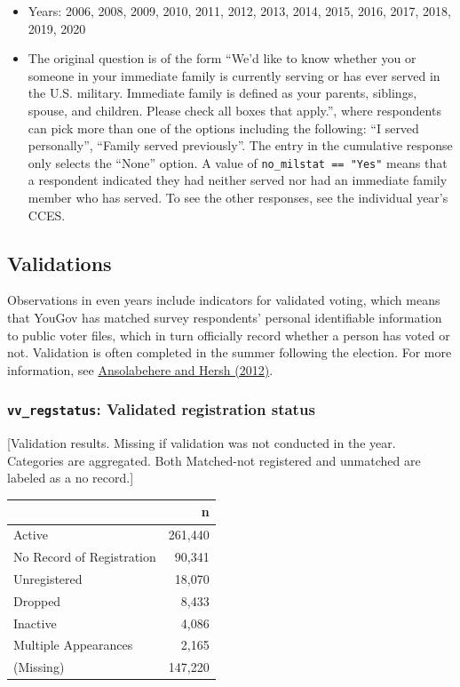 \documentclass[10pt,article,oneside]{memoir}
\theoremstyle{definition}
\begin{document}
\begin{itemize}
\tightlist
\item
  Years: 2006, 2008, 2009, 2010, 2011, 2012, 2013, 2014, 2015, 2016,
  2017, 2018, 2019, 2020
\item
  The original question is of the form ``We'd like to know whether you
  or someone in your immediate family is currently serving or has ever
  served in the U.S. military. Immediate family is defined as your
  parents, siblings, spouse, and children. Please check all boxes that
  apply.'', where respondents can pick more than one of the options
  including the following: ``I served personally'', ``Family served
  previously''. The entry in the cumulative response only selects the
  ``None'' option. A value of \texttt{no\_milstat\ ==\ "Yes"} means that
  a respondent indicated they had neither served nor had an immediate
  family member who has served. To see the other responses, see the
  individual year's CCES.
\end{itemize}

\newpage

\hypertarget{validations}{%
\subsection{Validations}\label{validations}}

Observations in even years include indicators for validated voting,
which means that YouGov has matched survey respondents' personal
identifiable information to public voter files, which in turn officially
record whether a person has voted or not. Validation is often completed
in the summer following the election. For more information, see
\href{https://doi.org/10.1093/pan/mps023}{Ansolabehere and Hersh
(2012)}.

\hypertarget{vv_regstatus-validated-registration-status}{%
\subsubsection{\texorpdfstring{\texttt{vv\_regstatus}: Validated
registration
status}{vv\_regstatus: Validated registration status}}\label{vv_regstatus-validated-registration-status}}

{[}Validation results. Missing if validation was not conducted in the
year. Categories are aggregated. Both Matched-not registered and
unmatched are labeled as a no record.{]}

\begin{table}[H]
\centering
\begin{tabular}{lr}
\toprule
 & n\\
\midrule
Active & 261,440\\
No Record of Registration & 90,341\\
Unregistered & 18,070\\
Dropped & 8,433\\
Inactive & 4,086\\
Multiple Appearances & 2,165\\
(Missing) & 147,220\\
\bottomrule
\end{tabular}
\end{table}
\end{document}
